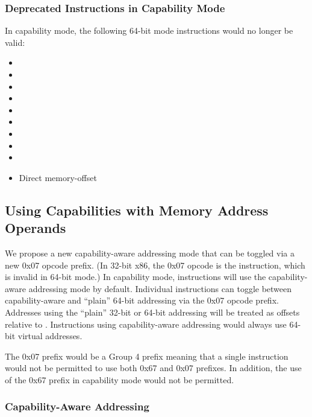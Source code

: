 \subsubsection{Deprecated Instructions in Capability Mode}

In capability mode, the following 64-bit mode instructions would no
longer be valid:

\begin{itemize}
  \item {}
  \item {}
  \item {}
  \item {}
  \item {}
  \item {}
  \item {}
  \item {}
  \item {}
  \item Direct memory-offset 
\end{itemize}

\subsection{Using Capabilities with Memory Address Operands}
\label{sec:x86:capability-addressing}

We propose a new capability-aware addressing mode that can be
toggled via a new 0x07
opcode prefix.  (In 32-bit x86, the 0x07 opcode is the
 instruction, which is invalid in 64-bit mode.)
In capability mode, instructions will use
the capability-aware addressing mode by default.  Individual
instructions can toggle between capability-aware and ``plain''
64-bit addressing via the 0x07 opcode prefix.  Addresses using the
``plain'' 32-bit or 64-bit addressing will be treated as offsets
relative to \DDC{}.  Instructions using capability-aware addressing
would always use 64-bit virtual addresses.

The 0x07 prefix would be a Group 4 prefix meaning that a single
instruction would not be permitted to use both 0x67 and 0x07 prefixes.
In addition, the use of the 0x67 prefix in capability mode would not
be permitted.

\subsubsection{Capability-Aware Addressing}

